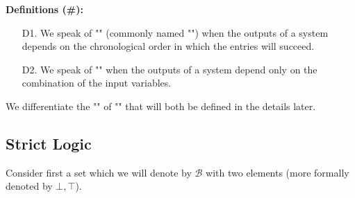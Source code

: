 	\textbf{Definitions (\#\mydef):}
	\begin{enumerate}
		\item[D1.] We speak of "" (commonly named "") when the outputs of a system depends on the chronological order in which the entries will succeed.
		
		\item[D2.] We speak of "" when the outputs of a system depend only on the combination of the input variables.
	\end{enumerate}
	\begin{tcolorbox}[title=Remark,colframe=black,arc=10pt]
	We differentiate the "" of "" that will both  be defined in the details later.
	\end{tcolorbox}
	
	\subsection{Strict Logic}
	Consider first a set which we will denote by $\mathcal{B}$ with two elements (more formally denoted by $\bot,\top$).
	
